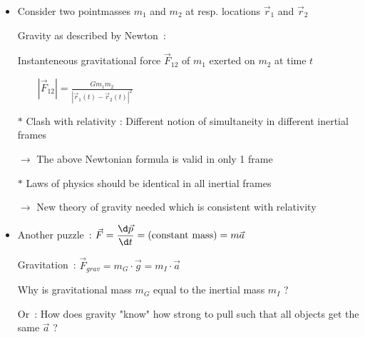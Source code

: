 \onecolumn
\begin{itemize}
\item Consider two pointmasses $m_{1}$ and $m_{2}$ at resp. locations $\vec{r}_{1}$ and $\vec{r}_{2}$
\item[] Gravity as described by Newton~:
\item[] Instanteneous gravitational force $\vec{F}_{12}$ of $m_{1}$ exerted on $m_{2}$ at time $t$
\item[] $\displaystyle \qquad |\vec{F}_{12}|=\frac{Gm_{1}m_{2}}{|\vec{r}_{1}(t)-\vec{r}_{2}(t)|^{2}}$
\item[$\ast$] {\blue Clash with relativity} : Different notion of simultaneity in different inertial frames
\item[] $\rightarrow$ The above Newtonian formula is valid in only 1 frame
\item[$\ast$] {\red Laws of physics should be identical in all inertial frames}
\item[] $\rightarrow$ {\blue New theory of gravity needed which is consistent with relativity}
\item Another puzzle~: $\displaystyle \vec{F}=\frac{\d\vec{p}}{\d t}=\text{(constant mass)}=m\vec{a}$
\item[] Gravitation~: $\vec{F}_{grav}=m_{G}\cdot\vec{g}=m_{I}\cdot\vec{a}$
\item[] Why is {\blue gravitational mass $m_{G}$} equal to the {\blue inertial mass $m_{I}$} ?
\item[] Or~: How does gravity "know" how strong to pull such that all objects get the same $\vec{a}$ ? 
\end{itemize}
